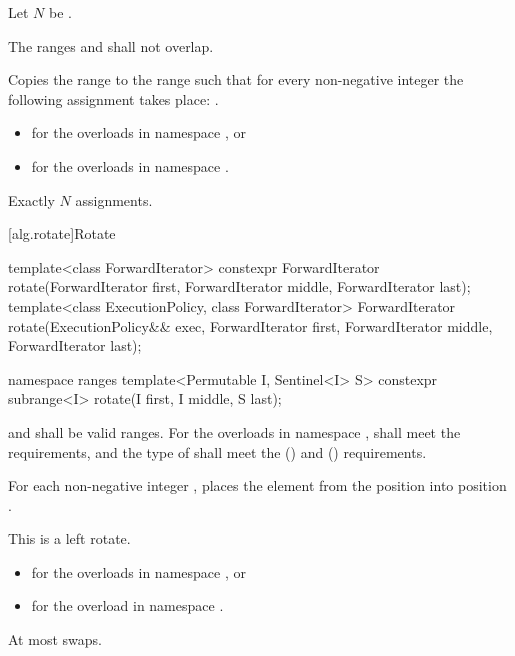 \begin{itemdescr}
\pnum
Let $N$ be .

\pnum
\requires
The ranges
and
shall not overlap.

\pnum
\effects
Copies the range
to the range
such that
for every non-negative integer
the following assignment takes place:
.

\pnum
\returns
\begin{itemize}
\item
{} for the overloads in namespace , or
\item
{} for the overloads
  in namespace .
\end{itemize}

\pnum
\complexity
Exactly $N$ assignments.
\end{itemdescr}

[alg.rotate]{Rotate}

%
\begin{itemdecl}
template<class ForwardIterator>
  constexpr ForwardIterator
    rotate(ForwardIterator first, ForwardIterator middle, ForwardIterator last);
template<class ExecutionPolicy, class ForwardIterator>
  ForwardIterator
    rotate(ExecutionPolicy&& exec,
           ForwardIterator first, ForwardIterator middle, ForwardIterator last);

namespace ranges {
  template<Permutable I, Sentinel<I> S>
    constexpr subrange<I> rotate(I first, I middle, S last);
}
\end{itemdecl}

\begin{itemdescr}
\pnum
\requires
{}
and
shall be valid ranges.
For the overloads in namespace ,
 shall meet the
 requirements, and
the type of  shall meet
the  () and
 () requirements.

\pnum
\effects
For each non-negative integer
,
places the element from the position
into position
.
\begin{note}
This is a left rotate.
\end{note}

\pnum
\returns
\begin{itemize}
\item {} for the overloads in
  namespace , or
\item {} for the overload in
  namespace .
\end{itemize}

\pnum
\complexity
At most
swaps.
\end{itemdescr}

